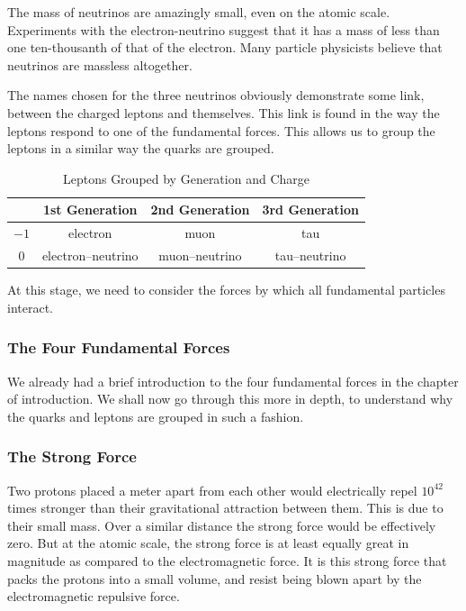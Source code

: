 The mass of neutrinos are amazingly small, even on the atomic scale. Experiments with the electron-neutrino suggest that it has a mass of less than one ten-thousanth of that of the electron. Many particle physicists believe that neutrinos are massless altogether.

The names chosen for the three neutrinos obviously demonstrate some link, between the charged leptons and themselves. This link is found in the way the leptons respond to one of the fundamental forces. This allows us to group the leptons in a similar way the quarks are grouped. 

\begin{table}[http]
\begin{center}
\begin{tabular}{|c|c c c|}
\hline & 1st Generation & 2nd Generation & 3rd Generation \\ \hline
$-1$ & electron & muon & tau \\ 
$0$ & electron--neutrino & muon--neutrino & tau--neutrino\\ \hline
\end{tabular}
\end{center}
\label{leptongroup::table}
\caption{Leptons Grouped by Generation and Charge}
\end{table}%

At this stage, we need to consider the forces by which all fundamental particles interact.

\subsubsection{The Four Fundamental Forces}
We already had a brief introduction to the four fundamental forces in the chapter of introduction. We shall now go through this more in depth, to understand why the quarks and leptons are grouped in such a fashion.

\subsubsection{The Strong Force}
Two protons placed a meter apart from each other would electrically repel $10^{42}$ times stronger than their gravitational attraction between them. This is due to their small mass. Over a similar distance the strong force would be effectively zero. But at the atomic scale, the strong force is at least equally great in magnitude as compared to the electromagnetic force. It is this strong force that packs the protons into a small volume, and resist being blown apart by the electromagnetic repulsive force.


